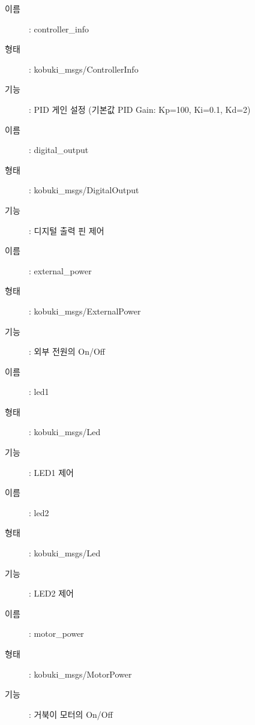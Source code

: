 \vspace{\baselineskip}
\begin{description}
\item[이름]: controller\_info 
\item[형태]: kobuki\_msgs/ControllerInfo
\item[기능]: PID 게인 설정 (기본값 PID Gain: Kp=100, Ki=0.1, Kd=2)
\end{description}

\vspace{\baselineskip}
\begin{description}
\item[이름]: digital\_output 
\item[형태]: kobuki\_msgs/DigitalOutput
\item[기능]: 디지털 출력 핀 제어
\end{description}

\vspace{\baselineskip}
\begin{description}
\item[이름]: external\_power
\item[형태]: kobuki\_msgs/ExternalPower
\item[기능]: 외부 전원의 On/Off
\end{description}

\vspace{\baselineskip}
\begin{description}
\item[이름]: led1
\item[형태]: kobuki\_msgs/Led
\item[기능]: LED1 제어
\end{description}

\vspace{\baselineskip}
\begin{description}
\item[이름]: led2
\item[형태]: kobuki\_msgs/Led
\item[기능]: LED2 제어
\end{description}

\vspace{\baselineskip}
\begin{description}
\item[이름]: motor\_power
\item[형태]: kobuki\_msgs/MotorPower
\item[기능]: 거북이 모터의 On/Off
\end{description}

